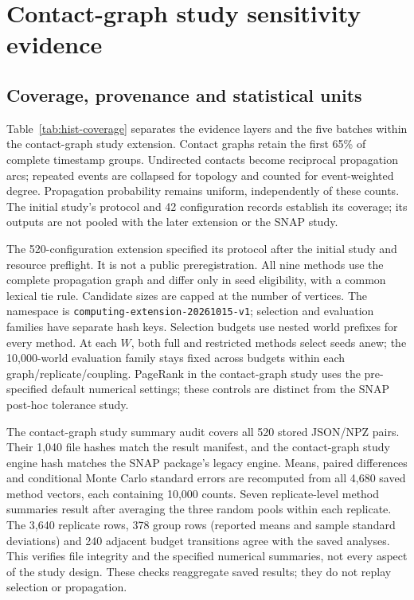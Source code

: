 \section{Contact-graph study sensitivity evidence}\label{sec:historical-evidence}
\subsection{Coverage, provenance and statistical units}
Table~\ref{tab:hist-coverage} separates the evidence layers and the five batches
within the contact-graph study extension. Contact graphs retain the first 65\% of complete
timestamp groups. Undirected contacts become reciprocal propagation arcs;
repeated events are collapsed for topology and counted for event-weighted
degree. Propagation probability remains uniform, independently of these counts.
The initial study's protocol and 42 configuration records establish its coverage;
its outputs are not pooled with the later extension or the SNAP study.


The 520-configuration extension specified its protocol after the initial study
and resource preflight. It is not a public preregistration. All nine methods use
the complete propagation graph and differ only in seed eligibility, with a
common lexical tie rule. Candidate sizes are capped at the number of vertices.
The namespace is \texttt{computing-extension-20261015-v1}; selection and evaluation
families have separate hash keys. Selection budgets use nested world prefixes for every method. At each $W$, both full and restricted methods select seeds anew; the 10,000-world evaluation family stays fixed across budgets within each graph/replicate/coupling.
PageRank in the contact-graph study uses the pre-specified default numerical settings; these controls
are distinct from the SNAP post-hoc tolerance study.

The contact-graph study summary audit covers all 520 stored JSON/NPZ pairs. Their 1,040 file
hashes match the result manifest, and the contact-graph study engine hash matches the
SNAP package's legacy engine. Means, paired differences and conditional
Monte Carlo standard errors are recomputed from all 4,680 saved method vectors,
each containing 10,000 counts. Seven replicate-level method summaries result after
averaging the three random pools within each replicate. The 3,640 replicate rows,
378 group rows (reported means and sample standard deviations) and 240 adjacent
budget transitions agree with the saved analyses. This verifies file integrity
and the specified numerical summaries, not every aspect of the study design.
These checks reaggregate saved results; they do not replay selection or propagation.

